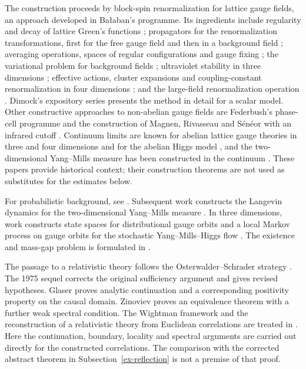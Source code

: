 The construction proceeds by block-spin renormalization for lattice gauge
fields, an approach developed in Ba\l{}aban's programme. Its ingredients
include regularity and decay of lattice Green's functions
\cite{Balaban83Green}; propagators for the renormalization transformations,
first for the free gauge field and then in a background field
\cite{Balaban84Prop1,Balaban84Prop2,Balaban85Background}; averaging
operations, spaces of regular configurations and gauge fixing
\cite{Balaban85Averaging,Balaban85Spaces}; the variational problem for
background fields \cite{Balaban85Variational}; ultraviolet stability in
three dimensions \cite{Balaban85UV3}; effective actions, cluster
expansions and coupling-constant renormalization in four dimensions
\cite{Balaban87RG1,Balaban88RG2,Balaban88Convergent}; and the large-field
renormalization operation \cite{Balaban89LF1,Balaban89LF2}. Dimock's
expository series \cite{Dimock13I,Dimock13II,Dimock13III} presents the
method in detail for a scalar model. Other constructive approaches to
non-abelian gauge fields are Federbush's phase-cell programme
\cite{Federbush86I,Federbush87III,Federbush88IV,Federbush90V,Federbush87VI}
and the construction of Magnen, Rivasseau and S\'en\'eor with an
infrared cutoff \cite{MRS93}. Continuum limits are known for abelian
lattice gauge theories in three and four dimensions
\cite{Gross83,Driver87} and for the abelian Higgs model \cite{King86},
and the two-dimensional Yang--Mills measure has been constructed in the
continuum \cite{Driver89,Sengupta97,Levy03}. These papers provide
historical context; their construction theorems are not used as
substitutes for the estimates below.

For probabilistic background, see \cite{Chatterjee19,Chevyrev22}.
Subsequent work constructs the Langevin dynamics for the two-dimensional
Yang--Mills measure \cite{CCHS22}. In three dimensions, work constructs
state spaces for distributional gauge orbits \cite{CaoChatterjee24}
and a local Markov process on gauge orbits for the stochastic
Yang--Mills--Higgs flow \cite{CCHS24}.
The existence and mass-gap problem is formulated in
\cite{JaffeWitten06}.

The passage to a relativistic theory follows the Osterwalder--Schrader
strategy \cite{OS73,OS75}. The 1975 sequel corrects the original
sufficiency argument and gives revised hypotheses. Glaser
\cite{Glaser74} proves analytic continuation and a corresponding
positivity property on the causal domain. Zinoviev \cite{Zinoviev95}
proves an equivalence theorem with a further weak spectral condition. The
Wightman framework and the reconstruction of a relativistic theory from
Euclidean correlations are treated in \cite{StreaterWightman,GlimmJaffe87}.
Here the continuation,
boundary, locality and spectral arguments are carried out directly for
the constructed correlations. The comparison with the corrected abstract
theorem in Subsection~\ref{ex-reflection} is not a premise of that proof.

